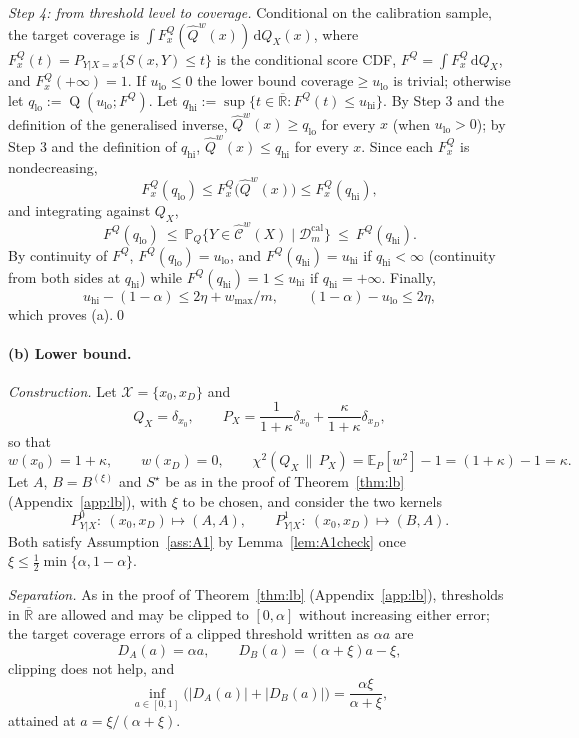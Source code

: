 \documentclass[11pt,a4paper]{article}
\newcommand{\PX}{P_X}
\newcommand{\QX}{Q_X}
\newcommand{\chisq}{\chi^2(\QX\,\|\,\PX)}
\newcommand{\E}{\mathbb{E}}
\newcommand{\Prob}{\mathbb{P}}
\newcommand{\Rbar}{\overline{\mathbb{R}}}
\newcommand{\Cset}{\widehat{\mathcal C}}
\DeclareMathOperator{\Qf}{Q}
\theoremstyle{plain}
\theoremstyle{definition}
\theoremstyle{remark}
\begin{document}
\emph{Step 4: from threshold level to coverage.} Conditional on the calibration sample, the target coverage is $\int F^Q_{x}(\widehat Q^w(x))\,\mathrm d\QX(x)$, where $F^Q_x(t)=P_{Y|X=x}\{S(x,Y)\le t\}$ is the conditional score CDF, $F^Q=\int F^Q_x\,\mathrm d\QX$, and $F^Q_x(+\infty)=1$. If $u_{\mathrm{lo}}\le0$ the lower bound $\text{coverage}\ge u_{\mathrm{lo}}$ is trivial; otherwise let $q_{\mathrm{lo}}:=\Qf(u_{\mathrm{lo}};F^Q)$. Let $q_{\mathrm{hi}}:=\sup\{t\in\Rbar:F^Q(t)\le u_{\mathrm{hi}}\}$. By Step 3 and the definition of the generalised inverse, $\widehat Q^w(x)\ge q_{\mathrm{lo}}$ for every $x$ (when $u_{\mathrm{lo}}>0$); by Step 3 and the definition of $q_{\mathrm{hi}}$, $\widehat Q^w(x)\le q_{\mathrm{hi}}$ for every $x$. Since each $F^Q_x$ is nondecreasing,
\[
F^Q_x(q_{\mathrm{lo}})\le F^Q_x\bigl(\widehat Q^w(x)\bigr)\le F^Q_x(q_{\mathrm{hi}}),
\]
and integrating against $\QX$,
\[
F^Q(q_{\mathrm{lo}})\ \le\ \Prob_Q\{Y\in\Cset^w(X)\mid\mathcal D^{\mathrm{cal}}_m\}\ \le\ F^Q(q_{\mathrm{hi}}).
\]
By continuity of $F^Q$, $F^Q(q_{\mathrm{lo}})=u_{\mathrm{lo}}$, and $F^Q(q_{\mathrm{hi}})=u_{\mathrm{hi}}$ if $q_{\mathrm{hi}}<\infty$ (continuity from both sides at $q_{\mathrm{hi}}$) while $F^Q(q_{\mathrm{hi}})=1\le u_{\mathrm{hi}}$ if $q_{\mathrm{hi}}=+\infty$. Finally,
\[
u_{\mathrm{hi}}-(1-\alpha)\le2\eta+w_{\max}/m,\qquad (1-\alpha)-u_{\mathrm{lo}}\le2\eta,
\]
which proves (a).\qed

\paragraph{(b) Lower bound.}
\emph{Construction.} Let $\mathcal X=\{x_0,x_D\}$ and
\[
\QX=\delta_{x_0},\qquad \PX=\frac1{1+\kappa}\delta_{x_0}+\frac\kappa{1+\kappa}\delta_{x_D},
\]
so that
\[
w(x_0)=1+\kappa,\qquad w(x_D)=0,\qquad \chisq=\E_P[w^2]-1=(1+\kappa)-1=\kappa .
\]
Let $A$, $B=B^{(\xi)}$ and $S^\star$ be as in the proof of Theorem~\ref{thm:lb} (Appendix~\ref{app:lb}), with $\xi$ to be chosen, and consider the two kernels
\[
P^0_{Y|X}:\ (x_0,x_D)\mapsto(A,A),\qquad P^1_{Y|X}:\ (x_0,x_D)\mapsto(B,A).
\]
Both satisfy Assumption~\ref{ass:A1} by Lemma~\ref{lem:A1check} once $\xi\le\tfrac12\min\{\alpha,1-\alpha\}$.

\emph{Separation.} As in the proof of Theorem~\ref{thm:lb} (Appendix~\ref{app:lb}), thresholds in $\Rbar$ are allowed and may be clipped to $[0,\alpha]$ without increasing either error; the target coverage errors of a clipped threshold written as $\alpha a$ are
\[
D_A(a)=\alpha a,\qquad D_B(a)=(\alpha+\xi)a-\xi,
\]
clipping does not help, and
\[
\inf_{a\in[0,1]}\bigl(|D_A(a)|+|D_B(a)|\bigr)=\frac{\alpha\xi}{\alpha+\xi},
\]
attained at $a=\xi/(\alpha+\xi)$.
\end{document}
